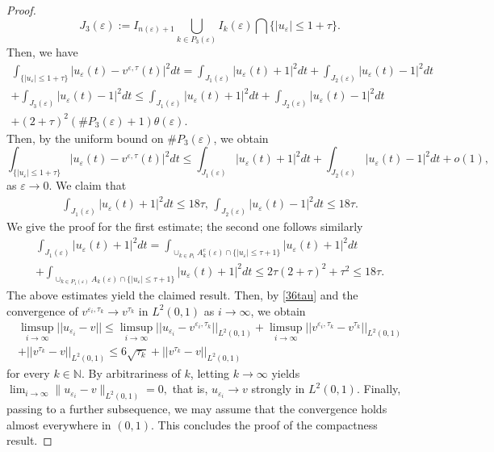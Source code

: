 \documentclass[12pt]{article}
\numberwithin{equation}{section}
\begin{document}
\begin{proof}
\begin{equation*}
    J_{3}(\varepsilon):=I_{n(\varepsilon)+1}\bigcup_{k\in P_{3}(\varepsilon)}I_{k}(\varepsilon)\bigcap \{\left|u_{\varepsilon}\right|\le{1+\tau\}}.
\end{equation*}
Then, we have 
\begin{multline*}
    \int_{\{\left|u_{\varepsilon}\right|\le1+\tau\}}\left|u_{\varepsilon}(t)-v^{\varepsilon,\tau}(t)\right|^2dt= \int_{J_{1}(\varepsilon)}\left|u_{\varepsilon}(t)+1\right|^2dt+\int_{J_{2}(\varepsilon)}\left|u_{\varepsilon}(t)-1\right|^2dt\\+\int_{J_{3}(\varepsilon)}\left|u_{\varepsilon}(t)-1\right|^2dt\le\int_{J_{1}(\varepsilon)}\left|u_{\varepsilon}(t)+1\right|^2dt+\int_{J_{2}(\varepsilon)}\left|u_{\varepsilon}(t)-1\right|^2dt\\+(2+\tau)^{2}(\#P_{3}(\varepsilon)+1)\theta(\varepsilon).
\end{multline*}
Then, by the uniform bound on $\#P_3(\varepsilon)$, we obtain
\begin{equation*}
\int_{\{\left|u_{\varepsilon}\right|\le1+\tau\}}
\left|u_{\varepsilon}(t)-v^{\varepsilon,\tau}(t)\right|^2dt
\le\int_{J_{1}(\varepsilon)}
\left|u_{\varepsilon}(t)+1\right|^2dt+\int_{J_{2}(\varepsilon)}
\left|u_{\varepsilon}(t)-1\right|^2dt+o(1),
\end{equation*}
as $\varepsilon\to0$. We claim that 
\begin{align*}
     \int_{J_{1}(\varepsilon)}\left|u_{\varepsilon}(t)+1\right|^2dt\le18\tau,\,\int_{J_{2}(\varepsilon)}\left|u_{\varepsilon}(t)-1\right|^2dt\le18\tau.
\end{align*}
We give the proof for the first estimate; the second one follows similarly
 \begin{multline*}
     \int_{J_{1}(\varepsilon)}\left|u_{\varepsilon}(t)+1\right|^2dt=\int_{\cup_{k\in P_{1}}A^{c}_k(\varepsilon)\cap\{\left|u_{\varepsilon}\right|\le\tau+1\}}\left|u_{\varepsilon}(t)+1\right|^2dt\\+\int_{\cup_{k\in P_{1}(\varepsilon)}A_k(\varepsilon)\cap\{\left|u_{\varepsilon}\right|\le\tau+1\}}\left|u_{\varepsilon}(t)+1\right|^2dt\le2\tau(2+\tau)^{2}+\tau^{2}\le18\tau.
 \end{multline*}
 The above estimates yield the claimed result. Then, by \eqref{36tau} and the convergence of $v^{\varepsilon_i,\tau_k}\to v^{\tau_k}$ in $L^{2}(0,1)$ as $i\to\infty$, we obtain
\begin{multline*} \limsup_{i\to\infty}||u_{\varepsilon_{i}}-v|| \le\limsup_{i\to\infty}||u_{\varepsilon_{i}}-v^{\varepsilon_{i},\tau_{k}}||_{L^{2}(0,1)}+\limsup_{i\to\infty}||v^{\varepsilon_{i},\tau_{k}}-v^{\tau_{k}}||_{L^{2}(0,1)}\\+||v^{\tau_{k}}-v||_{L^{2}(0,1)}\le6\sqrt{\tau_{k}}+||v^{\tau_{k}}-v||_{L^{2}(0,1)} 
\end{multline*}
for every $k \in \mathbb{N}$. By arbitrariness of $k$, letting $k \to \infty$ yields $\lim_{i\to\infty} \|u_{\varepsilon_i}-v\|_{L^2(0,1)} = 0,$ that is, $u_{\varepsilon_i} \to v$ strongly in $L^2(0,1)$. Finally, passing to a further subsequence, we may assume that the convergence holds almost everywhere in $(0,1)$. This concludes the proof of the compactness result.
\end{proof}
\end{document}

